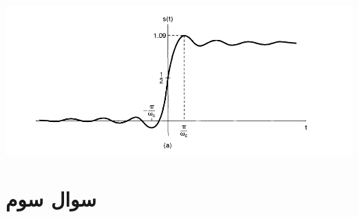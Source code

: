 \documentclass[12pt]{article}
\begin{document}
\begin{enumerate}
	\includegraphics[width = 1.0\textwidth]{images/4.png}
	

	

\end{enumerate}

\newpage
\section{سوال سوم}
\end{document}
